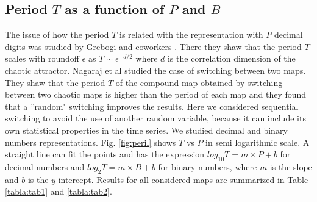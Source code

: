 \subsection{Period $T$ as a function of $P$ and $B$}
The issue of how the period $T$ is related with the representation with $P$ decimal digits was studied by Grebogi and coworkers \cite{Grebogi1988}. There they shaw that the period $T$ scales with roundoff $\epsilon$ as
$T\sim\epsilon^{-d/2}$ where $d$ is the correlation dimension of
the chaotic attractor. Nagaraj et al \cite{Nagaraj2008} studied the case of switching between two maps. They shaw that the period $T$ of the
compound map obtained by switching between two chaotic maps is
higher than the period of each map and they found that a ''random" switching improves the results. Here we considered  sequential switching to avoid the use of another random variable, because it can include its own statistical properties in the time series. We studied decimal and binary numbers representations. Fig. \ref{fig:peril} shows  $T$ vs $P$ in semi logarithmic scale. 
A straight line can fit the points and has the expression  $log_{10}T=m \times P + b$ for decimal numbers and  $log_{2}T=m \times B + b$ for binary numbers, where $m$ is the slope and $b$ is the $y$-intercept. Results for all considered maps are summarized in Table \ref{tabla:tab1} and \ref{tabla:tab2}.

